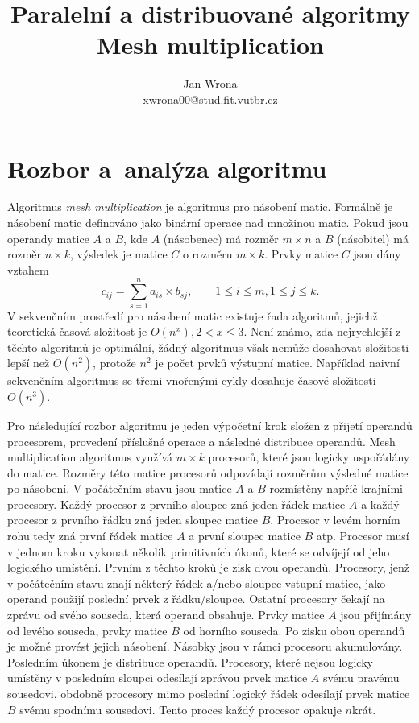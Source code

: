 \documentclass[a4paper, 12pt]{article}[24.4.2015]
\title{Paralelní a distribuované algoritmy\\Mesh multiplication}
\author{Jan Wrona\\xwrona00@stud.fit.vutbr.cz}
\date{}
\begin{document}
\maketitle

\section{Rozbor a~analýza algoritmu} \label{analysis}
Algoritmus \emph{mesh multiplication} je algoritmus pro násobení matic. Formálně je násobení matic definováno jako binární operace nad množinou matic. Pokud jsou operandy matice \(A\) a \(B\), kde \(A\) (násobenec) má rozměr \(m \times n\) a \(B\) (násobitel) má rozměr \(n \times k\), výsledek je matice \(C\) o rozměru \(m \times k\). Prvky matice \(C\) jsou dány vztahem
\begin{equation}\label{mat_mult}
c_{ij} = \sum_{s = 1}^{n} a_{is} \times b_{sj}, \qquad 1 \leq i \leq m, 1 \leq j \leq k.
\end{equation}
V sekvenčním prostředí pro násobení matic existuje řada algoritmů, jejichž teoretická časová složitost je \(O(n^x), 2 < x \leq 3\). Není známo, zda nejrychlejší z těchto algoritmů je optimální, žádný algoritmus však nemůže dosahovat složitosti lepší než \(O(n^2)\), protože \(n^2\) je počet prvků výstupní matice. Například naivní sekvenčním algoritmus se třemi vnořenými cykly dosahuje časové složitosti \(O(n^3)\).

Pro následující rozbor algoritmu je jeden výpočetní krok složen z přijetí operandů procesorem, provedení příslušné operace a následné distribuce operandů. Mesh multiplication algoritmus využívá \(m \times k\) procesorů, které jsou logicky uspořádány do matice. Rozměry této matice procesorů odpovídají rozměrům výsledné matice po násobení. V počátečním stavu jsou matice \(A\) a \(B\) rozmístěny napříč krajními procesory. Každý procesor z prvního sloupce zná jeden řádek matice \(A\) a každý procesor z prvního řádku zná jeden sloupec matice \(B\). Procesor v levém horním rohu tedy zná první řádek matice \(A\) a první sloupec matice \(B\) atp. Procesor musí v jednom kroku vykonat několik primitivních úkonů, které se odvíjejí od jeho logického umístění. Prvním z těchto kroků je zisk dvou operandů. Procesory, jenž v počátečním stavu znají některý řádek a/nebo sloupec vstupní matice, jako operand použijí poslední prvek z řádku/sloupce. Ostatní procesory čekají na zprávu od svého souseda, která operand obsahuje. Prvky matice \(A\) jsou přijímány od levého souseda, prvky matice \(B\) od horního souseda. Po zisku obou operandů je možné provést jejich násobení. Násobky jsou v rámci procesoru akumulovány. Posledním úkonem je distribuce operandů. Procesory, které nejsou logicky umístěny v posledním sloupci odesílají zprávou prvek matice \(A\) svému pravému sousedovi, obdobně procesory mimo poslední logický řádek odesílají prvek matice \(B\) svému spodnímu sousedovi. Tento proces každý procesor opakuje \(n\)krát.
\end{document}
